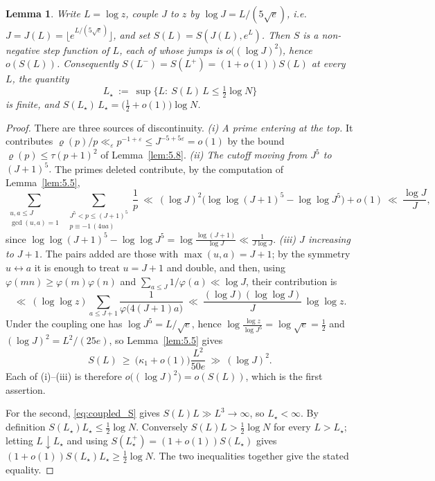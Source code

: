 \documentclass[11pt, a4paper]{article}
\theoremstyle{plain}
\newtheorem{lemma}[theorem]{Lemma}
\theoremstyle{definition}
\begin{document}
\begin{lemma}\label{lem:saturation}
Write $L=\log z$, couple $J$ to $z$ by $\log J=L/(5\sqrt e)$, i.e.\ $J=J(L)=\lfloor e^{L/(5\sqrt e)}\rfloor$, and set $S(L)=S(J(L),e^{L})$. Then $S$ is a non-negative step function of $L$, each of whose jumps is $o\big((\log J)^{2}\big)$, hence $o(S(L))$. Consequently $S(L^{-})=S(L^{+})=(1+o(1))S(L)$ at every $L$, the quantity
$$L_\star\ :=\ \sup\big\{L:\ S(L)\,L\le\tfrac12\log N\big\}$$
is finite, and $S(L_\star)\,L_\star=\big(\tfrac12+o(1)\big)\log N$.
\end{lemma}
\begin{proof}
There are three sources of discontinuity. \emph{(i) A prime entering at the top.} It contributes $\varrho(p)/p\ll_\varepsilon p^{-1+\varepsilon}\le J^{-5+5\varepsilon}=o(1)$ by the bound $\varrho(p)\le\tau(p+1)^{2}$ of Lemma~\ref{lem:5.8}. \emph{(ii) The cutoff moving from $J^{5}$ to $(J+1)^{5}$.} The primes deleted contribute, by the computation of Lemma~\ref{lem:5.5},
$$\sum_{\substack{u,a\le J\\ \gcd(u,a)=1}}\ \sum_{\substack{J^{5}<p\le (J+1)^{5}\\ p\equiv-1\,(4ua)}}\frac1p\ \ll\ (\log J)^{2}\Big(\log\log (J+1)^{5}-\log\log J^{5}\Big)+o(1)\ \ll\ \frac{\log J}{J},$$
since $\log\log(J+1)^{5}-\log\log J^{5}=\log\frac{\log(J+1)}{\log J}\ll\frac1{J\log J}$. \emph{(iii) $J$ increasing to $J+1$.} The pairs added are those with $\max(u,a)=J+1$; by the symmetry $u\leftrightarrow a$ it is enough to treat $u=J+1$ and double, and then, using $\varphi(mn)\ge\varphi(m)\varphi(n)$ and $\sum_{a\le J}1/\varphi(a)\ll\log J$, their contribution is
$$\ll\ (\log\log z)\sum_{a\le J+1}\frac{1}{\varphi\big(4(J+1)a\big)}\ \ll\ \frac{(\log J)(\log\log J)}{J}\,\log\log z .$$
Under the coupling one has $\log J^{5}=L/\sqrt e$, hence $\log\frac{\log z}{\log J^{5}}=\log\sqrt e=\frac12$ and $(\log J)^{2}=L^{2}/(25e)$, so Lemma~\ref{lem:5.5} gives
\begin{equation}\label{eq:coupled_S}
S(L)\ \ge\ \big(\kappa_1+o(1)\big)\frac{L^{2}}{50e}\ \gg\ (\log J)^{2}.
\end{equation}
Each of (i)--(iii) is therefore $o\big((\log J)^{2}\big)=o(S(L))$, which is the first assertion.

For the second, \eqref{eq:coupled_S} gives $S(L)L\gg L^{3}\to\infty$, so $L_\star<\infty$. By definition $S(L_\star)L_\star\le\frac12\log N$. Conversely $S(L)L>\frac12\log N$ for every $L>L_\star$; letting $L\downarrow L_\star$ and using $S(L_\star^{+})=(1+o(1))S(L_\star)$ gives $(1+o(1))S(L_\star)L_\star\ge\frac12\log N$. The two inequalities together give the stated equality.
\end{proof}
\end{document}
